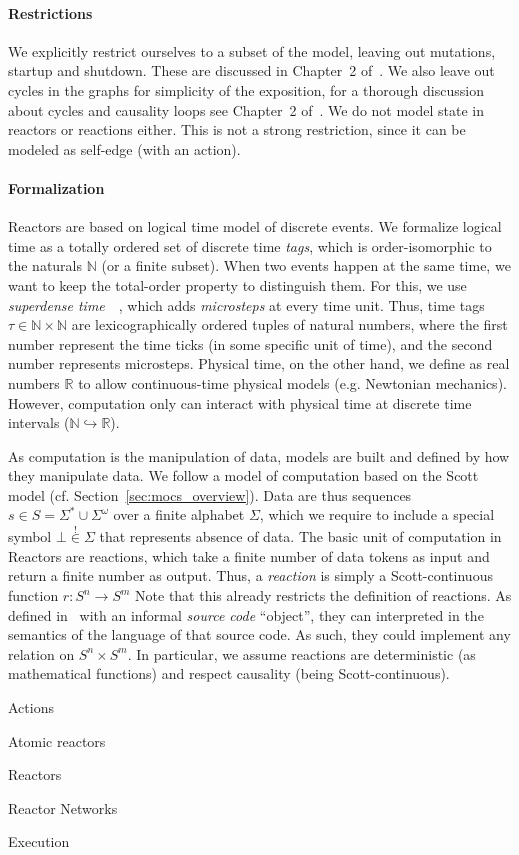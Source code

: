 \paragraph{Restrictions}
We explicitly restrict ourselves to a subset of the model, leaving out mutations, startup and shutdown. These are discussed in Chapter~2 of~\cite{lohstroh_phdthesis}.
We also leave out cycles in the graphs for simplicity of the exposition, for a thorough discussion about cycles and causality loops see Chapter~2 of~\cite{lohstroh_phdthesis}.
We do not model state in reactors or reactions either. This is not a strong restriction, since it can be modeled as self-edge (with an action).

\paragraph{Formalization}
Reactors are based on logical time model of discrete events.
We formalize logical time as a totally ordered set of discrete time \emph{tags}, which is order-isomorphic to the naturals $\mathbb{N}$ (or a finite subset). 
When two events happen at the same time, we want to keep the total-order property to distinguish them.
For this, we use \emph{superdense time}~\cite{superdense,Ptolemaeus:14:SystemDesign}~, which adds \emph{microsteps} at every time unit.
Thus, time tags $\tau \in \mathbb{N} \times \mathbb{N}$ are lexicographically ordered tuples of natural numbers, where the first number represent the time ticks (in some specific unit of time), and the second number represents microsteps.
Physical time, on the other hand, we define as real numbers $\mathbb{R}$ to allow continuous-time physical models (e.g. Newtonian mechanics).
However, computation only can interact with physical time at discrete time intervals ($\mathbb{N} \hookrightarrow \mathbb{R}$).

As computation is the manipulation of data, models are built and defined by how they manipulate data.
We follow a model of computation based on the Scott model (cf. Section~\ref{sec:mocs_overview}).
Data are thus sequences $s \in S = \Sigma^* \cup \Sigma^\omega$ over a finite alphabet $\Sigma$, which we require to include a special symbol $\bot \overset{!}{\in} \Sigma$ that represents absence of data.
The basic unit of computation in Reactors are reactions, which take a finite number of data tokens as input and return a finite number as output.
Thus, a \emph{reaction} is simply a Scott-continuous function $r : S^n \rightarrow S^m$
Note that this already restricts the definition of reactions.
As defined in~\cite{lohstroh_cyphy19} with an informal \emph{source code} ``object'', they can interpreted in the semantics of the language of that source code.
As such, they could implement any relation on $S^n \times S^m$.
In particular, we assume reactions are deterministic (as mathematical functions) and respect causality (being Scott-continuous).


Actions

Atomic reactors

Reactors

Reactor Networks

Execution